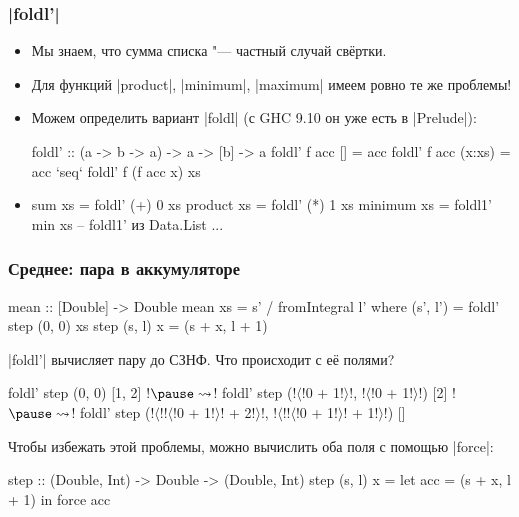\documentclass[11pt]{beamer}
\begin{document}
\begin{frame}[fragile]
  \frametitle{\haskinline|foldl'|}
  \begin{itemize}
    \item Мы знаем, что сумма списка "--- частный случай свёртки.
    \item Для функций \haskinline|product|, \haskinline|minimum|, \haskinline|maximum| имеем ровно те же проблемы!
    \item Можем определить вариант \haskinline|foldl| (с GHC 9.10 он уже есть в \haskinline|Prelude|):
          \begin{haskellsmall}
            foldl' :: (a -> b -> a) -> a -> [b] -> a
            foldl' f acc []     = acc
            foldl' f acc (x:xs) = acc `seq` foldl' f (f acc x) xs
          \end{haskellsmall}
    \item \pause
          \begin{haskellsmall}
            sum xs = foldl' (+) 0 xs
            product xs = foldl' (*) 1 xs
            minimum xs = foldl1' min xs  -- foldl1' из Data.List
            ...
          \end{haskellsmall}
  \end{itemize}
\end{frame}

\begin{frame}[fragile]
  \frametitle{Среднее: пара в аккумуляторе}
  \small
  \begin{haskellsmall}
    mean :: [Double] -> Double
    mean xs = s' / fromIntegral l'
      where (s', l') = foldl' step (0, 0) xs
            step (s, l) x = (s + x, l + 1)
  \end{haskellsmall}
  \haskinline|foldl'| вычисляет пару до СЗНФ. Что происходит с её полями? \pause
  \begin{haskellsmall}
    foldl' step (0, 0) [1, 2] !$\pause \rightsquigarrow$!
    foldl' step (!$\langle$!0 + 1!$\rangle$!, !$\langle$!0 + 1!$\rangle$!) [2] !$\pause \rightsquigarrow$!
    foldl' step (!$\langle$!!$\langle$!0 + 1!$\rangle$! + 2!$\rangle$!, !$\langle$!!$\langle$!0 + 1!$\rangle$! + 1!$\rangle$!) []
  \end{haskellsmall}
  \pause
  Чтобы избежать этой проблемы, можно вычислить оба поля с помощью \haskinline|force|:
  \begin{haskellsmall}
    step :: (Double, Int) -> Double -> (Double, Int)
    step (s, l) x = let acc = (s + x, l + 1)
                    in force acc
  \end{haskellsmall}
\end{frame}
\end{document}
